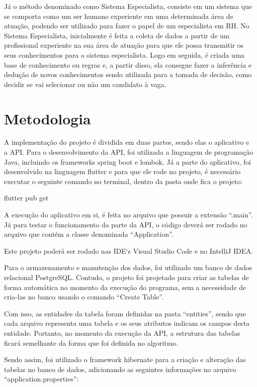 \documentclass[conference]{IEEEtran}
\begin{document}
Já o método denominado como Sistema Especialista, consiste em um sistema que se comporta como um ser humano experiente em uma determinada área de atuação, podendo ser utilizado para fazer o papel de um especialista em RH. No Sistema Especialista, inicialmente é feita a coleta de dados a partir de um profissional experiente na sua área de atuação para que ele possa transmitir os seus conhecimentos para o sistema especialista. Logo em seguida, é criada uma base de conhecimento ou regras e, a partir disso, ela consegue fazer a inferência e dedução de novos conhecimentos sendo utilizada para a tomada de decisão, como decidir se vai selecionar ou não um candidato à vaga. 


\section*{Metodologia}
A implementação do projeto é dividida em duas partes, sendo elas o aplicativo e a API. Para o desenvolvimento da API, foi utilizada a linguagem de programação Java, incluindo os frameworks spring boot e lombok. Já a parte do aplicativo, foi desenvolvido na linguagem flutter e para que ele rode no projeto, é necessário executar o seguinte comando no terminal, dentro da pasta onde fica o projeto:

\vspace{3mm}
\centerline{flutter pub get}
\vspace{3mm}
A execução do aplicativo em si, é feita no arquivo que possuir a extensão “.main”. Já para testar o funcionamento da parte da API, o código deverá ser rodado no arquivo que contém a classe denominada “Application”.

Este projeto poderá ser rodado nas IDE`s Visual Studio Code e no IntelliJ IDEA.

Para o armazenamento e manutenção dos dados, foi utilizado um banco de dados relacional PostgreSQL. Contudo, o projeto foi projetado para criar as tabelas de forma automática no momento da execução do programa, sem a necessidade de cria-las no banco usando o comando “Create Table”. 

Com isso, as entidades da tabela foram definidas na pasta “entities”, sendo que cada arquivo representa uma tabela e os seus atributos indicam os campos desta entidade. Portanto, no momento da execução da API, a estrutura das tabelas ficará semelhante da forma que foi definida no algoritmo.

Sendo assim, foi utilizado o framework hibernate para a criação e alteração das tabelas no banco de dados, adicionando as seguintes informações no arquivo “application.properties”:
\end{document}
